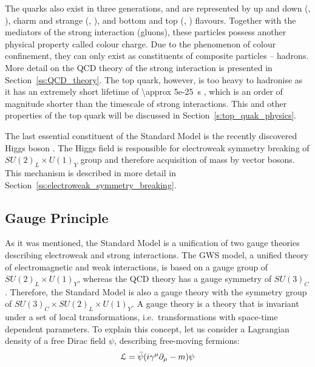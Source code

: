 The quarks also exist in three generations, and are represented by up and down (\cPqu, \cPqd), charm and strange (\cPqc,
\cPqs), and bottom and top (\cPqb, \cPqt) flavours. Together with the mediators of the strong interaction (gluons),
these particles possess another physical property called colour charge. Due to the phenomenon of colour confinement,
they can only exist as constituents of composite particles -- hadrons. More detail on the QCD theory of the strong
interaction is presented in Section~\ref{ss:QCD_theory}. The top quark, however, is too heavy to hadronise as it has an
extremely short lifetime of \SI{\approx 5e-25}{\s} \autocite{PDG}, which is an order of magnitude shorter than the
timescale of strong interactions. This and other properties of the top quark will be discussed in
Section~\ref{s:top_quak_physics}.

The last essential constituent of the Standard Model is the recently discovered Higgs boson
\autocite{ATLAS_higgs_observation, CMS_higgs_observation}. The Higgs field is responsible for electroweak symmetry
breaking of $SU(2)_L \times U(1)_Y$ group and therefore acquisition of mass by vector bosons. This mechanism is
described in more detail in Section~\ref{ss:electroweak_symmetry_breaking}.

\vspace{1cm}



\newpage
\subsection{Gauge Principle}
\label{ss:gauge_principle}
As it was mentioned, the Standard Model is a unification of two gauge theories describing electroweak and strong
interactions. The GWS model, a unified theory of electromagnetic and weak interactions, is based on a gauge group of
$SU(2)_L \times U(1)_Y$, whereas the QCD theory has a gauge symmetry of $SU(3)_C$. Therefore, the Standard Model is also
a gauge theory with the symmetry group of $SU(3)_C \times SU(2)_L \times U(1)_Y$. A gauge theory is a theory that is
invariant under a set of local transformations, i.e.\ transformations with space-time dependent parameters. To explain
this concept, let us consider a Lagrangian density of a free Dirac field $\psi$, describing free-moving fermions:
\begin{equation}
\mathcal{L} = \bar{\psi}(i \gamma^\mu	\partial_\mu - m) \psi
\label{eq:dirac_field_L}
\end{equation}

